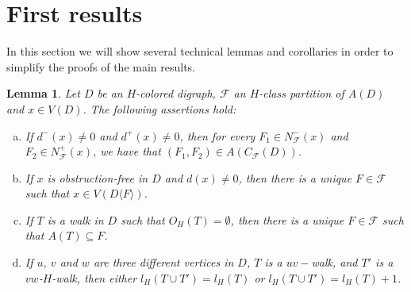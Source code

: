 \documentclass[10pt,a4paper]{article}
\newtheorem{lemma}[theorem]{Lemma}
\begin{document}
\section{First results}

In this section we will show several technical lemmas and corollaries in order to simplify the proofs of the main results.

\begin{lemma}
\label{obs1}
Let $D$ be an $H$-colored digraph, $\mathscr{F}$ an $H$-class partition of $A(D)$ and $x \in V(D)$. The following assertions hold:
	\begin{enumerate}[a)]
	\item If $d^{-}(x) \neq 0$ and $d^{+}(x) \neq 0$, then for every $F_{1} \in N^{-}_{\mathscr{F}}(x)$ and $F_{2} \in N^{+}_{\mathscr{F}}(x)$, we have that $(F_{1}, F_{2}) \in A(C_{\mathscr{F}}(D))$. 
	
	\item If $x$ is obstruction-free in $D$ and $d(x) \neq 0$, then there is a unique $F \in \mathscr{F}$ such that $x \in V(D \langle F \rangle )$. 
	
	\item If $T$ is a walk in $D$ such that $O_{H}(T)=\emptyset$, then there is a unique $F \in \mathscr{F}$ such that $A(T) \subseteq F$.
	
	\item If $u$, $v$ and $w$ are three different vertices in $D$, $T$ is a $uv-$walk, and $T'$ is a $vw$-$H$-walk, then either $l_{H}(T \cup T')=l_{H}(T)$ or $l_{H}(T \cup T') = l_{H}(T) +1$.
	\end{enumerate}
\end{lemma}
\end{document}

